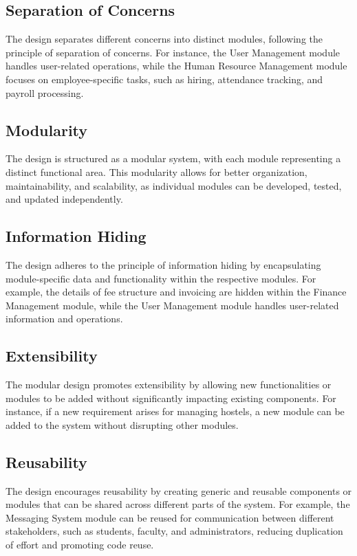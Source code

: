 \documentclass[11pt]{article}
\begin{document}
\subsection{Separation of Concerns}
The design separates different concerns into distinct modules, following the principle of separation of concerns. For instance, the User Management module handles user-related operations, while the Human Resource Management module focuses on employee-specific tasks, such as hiring, attendance tracking, and payroll processing.

\subsection{Modularity}
The design is structured as a modular system, with each module representing a distinct functional area. This modularity allows for better organization, maintainability, and scalability, as individual modules can be developed, tested, and updated independently.

\subsection{Information Hiding}
The design adheres to the principle of information hiding by encapsulating module-specific data and functionality within the respective modules. For example, the details of fee structure and invoicing are hidden within the Finance Management module, while the User Management module handles user-related information and operations.

\subsection{Extensibility}
The modular design promotes extensibility by allowing new functionalities or modules to be added without significantly impacting existing components. For instance, if a new requirement arises for managing hostels, a new module can be added to the system without disrupting other modules.

\subsection{Reusability}
The design encourages reusability by creating generic and reusable components or modules that can be shared across different parts of the system. For example, the Messaging System module can be reused for communication between different stakeholders, such as students, faculty, and administrators, reducing duplication of effort and promoting code reuse.
\end{document}
